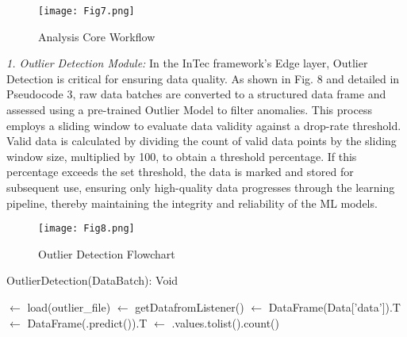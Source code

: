 \documentclass[11pt]{article}
\begin{document}
	\begin{figure}[ht]
		\centering
		\texttt{[image: Fig7.png]}
		\caption{Analysis Core Workflow}
	\end{figure}
	
	\textit{1. Outlier Detection Module:} In the InTec framework’s Edge layer, Outlier Detection is critical for ensuring
	data quality. As shown in Fig. 8 and detailed in Pseudocode 3, raw data batches
	are converted to a structured data frame and assessed using a pre-trained Outlier
	Model to filter anomalies. This process employs a sliding window to evaluate
	data validity against a drop-rate threshold. Valid data is calculated by dividing
	the count of valid data points by the sliding window size, multiplied by 100, to
	obtain a threshold percentage. If this percentage exceeds the set threshold, the
	data is marked and stored for subsequent use, ensuring only high-quality data
	progresses through the learning pipeline, thereby maintaining the integrity and
	reliability of the ML models.
	
	\begin{figure}[th]
		\centering
		\texttt{[image: Fig8.png]}
		\caption{Outlier Detection Flowchart}
	\end{figure}
	
	\begin{algorithm}[h]
		
		\caption{OutlierDetection(DataBatch): Void}\label{alg:outlier-detection}
		
		\BlankLine
		\OutlierModel $\leftarrow$ load(outlier\_file)\;
		\Data $\leftarrow$ getDatafromListener()\;
		\ConvertedData $\leftarrow$ DataFrame(Data['data']).T\;
		\DataValidation $\leftarrow$ DataFrame(\OutlierModel.predict(\ConvertedData)).T\;
		\DataValidCount $\leftarrow$ \DataValidation.values.tolist().count()\;
		
		\BlankLine
	\end{algorithm}
	
\end{document}
